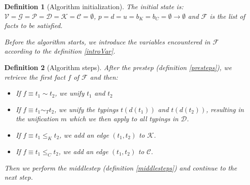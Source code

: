 \documentclass[12pt,a4paper]{article}
\newtheorem{definition}{Definition}
\begin{document}
\begin{definition}[Algorithm initialization]
    The initial state is: $\mathcal{V} = \mathcal{G} = \mathcal{P} = \mathcal{D} = \mathcal{K} = \mathcal{C} = \emptyset$, $p = d = u = b_K = b_C = \emptyset \to \emptyset$ and $\mathcal{F}$ is the list of facts to be satisfied.

    Before the algorithm starts, we introduce the variables encountered in $\mathcal{F}$ according to the definition \ref{introVar}.
\end{definition}

\begin{definition}[Algorithm steps]
    After the prestep (definition \ref{presteps}), we retrieve the first fact $f$ of $\mathcal{F}$ and then:

    \begin{itemize}
        \item If $f \equiv t_1 \sim t_2$, we unify $t_1$ and $t_2$
        \item If $f \equiv t_1 \sim_T t_2$, we unify the typings $t (d (t_1))$ and $t (d (t_2))$, resulting in the unification $m$ which we then apply to all typings in $\mathcal{D}$.
        \item If $f \equiv t_1 \leq_K t_2$, we add an edge $(t_1, t_2)$ to $\mathcal{K}$.
        \item If $f \equiv t_1 \leq_C t_2$, we add an edge $(t_1, t_2)$ to $\mathcal{C}$.
    \end{itemize}

    Then we perform the middlestep (definition \ref{middlesteps}) and continue to the next step.
\end{definition}
\end{document}
